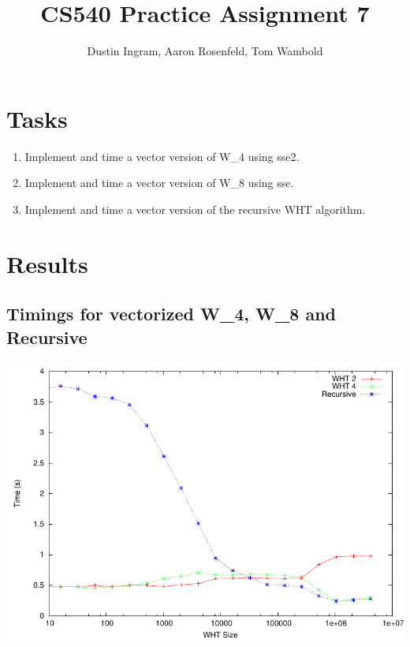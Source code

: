 \documentclass{article}
\title{CS540 Practice Assignment 7}
\author{Dustin Ingram, Aaron Rosenfeld, Tom Wambold}
\begin{document}
\maketitle
\newpage
\section{Tasks}
\begin{enumerate}
    \item Implement and time a vector version of W\_4 using sse2.
    \item Implement and time a vector version of W\_8 using sse.
    \item Implement and time a vector version of the recursive WHT algorithm.
\end{enumerate}
\section{Results}
\subsection{Timings for vectorized W\_4, W\_8 and Recursive}
  \includegraphics[width=\textwidth]{p7.pdf}
\end{document}
